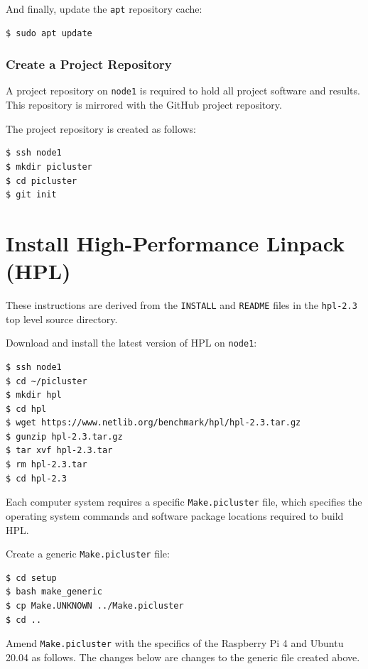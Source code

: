 \documentclass{report}
\begin{document}
And finally, update the \verb|apt| repository cache:

\lstset{style=type}
\begin{lstlisting}[]
$ sudo apt update
\end{lstlisting}



\subsection{Create a Project Repository}

A project repository on \verb|node1| is required to hold all project software and results. This repository is mirrored with the GitHub project repository.

The project repository is created as follows:

\lstset{style=type}
\begin{lstlisting}[]
$ ssh node1
$ mkdir picluster
$ cd picluster
$ git init
\end{lstlisting}



%
%
\chapter{Install High-Performance Linpack (HPL)}

These instructions are derived from the \verb|INSTALL| and \verb|README| files in the \verb|hpl-2.3| top level source directory.

Download and install the latest version of HPL on \verb|node1|:

\lstset{style=type}
\begin{lstlisting}
$ ssh node1
$ cd ~/picluster
$ mkdir hpl
$ cd hpl
$ wget https://www.netlib.org/benchmark/hpl/hpl-2.3.tar.gz
$ gunzip hpl-2.3.tar.gz
$ tar xvf hpl-2.3.tar
$ rm hpl-2.3.tar
$ cd hpl-2.3
\end{lstlisting}

Each computer system requires a specific \verb|Make.picluster| file, which specifies the operating system commands and software package locations required to build HPL. 

Create a generic \verb|Make.picluster| file:

\lstset{style=type}
\begin{lstlisting}
$ cd setup
$ bash make_generic
$ cp Make.UNKNOWN ../Make.picluster
$ cd ..
\end{lstlisting}

Amend \verb|Make.picluster| with the specifics of the Raspberry Pi 4 and Ubuntu 20.04 as follows. The changes below are changes to the generic file created above.
\end{document}
